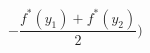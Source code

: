 \documentclass[preview]{standalone}
\begin{document}
\begin{center}
$-\dfrac{f^*(y_1) + f^*(y_2)}{2})$
\end{center}
\end{document}
